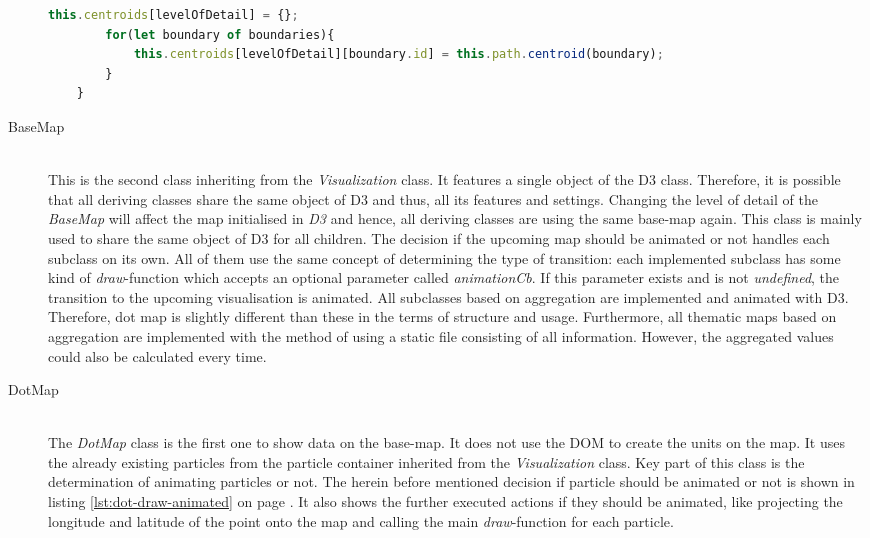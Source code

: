 \begin{description}
\begin{lstlisting}[language=JavaScript, caption={Calculate a look-up dictionary for all data items depending on the level of detail.}, label={lst:d3-calculate-centroids}]
        this.centroids[levelOfDetail] = {};
        for(let boundary of boundaries){
            this.centroids[levelOfDetail][boundary.id] = this.path.centroid(boundary);
        }
    }
\end{lstlisting}


\item[BaseMap] \hfill \\
This is the second class inheriting from the \textit{Visualization} class. It features a single object of the \ac{D3} class. Therefore, it is possible that all deriving classes share the same object of \ac{D3} and thus, all its features and settings. Changing the level of detail of the \textit{BaseMap} will affect the map initialised in \textit{\ac{D3}} and hence, all deriving classes are using the same base-map again. This class is mainly used to share the same object of \ac{D3} for all children.
The decision if the upcoming map should be animated or not handles each subclass on its own. All of them use the same concept of determining the type of transition: each implemented subclass has some kind of \textit{draw}-function which accepts an optional parameter called \textit{animationCb}. If this parameter exists and is not \textit{undefined}, the transition to the upcoming visualisation is animated.
All subclasses based on aggregation are implemented and animated with \ac{D3}. Therefore, dot map is slightly different than these in the terms of structure and usage. Furthermore, all thematic maps based on aggregation are implemented with the method of using a static file consisting of all information. However, the aggregated values could also be calculated every time.

\item[DotMap] \hfill \\
The \textit{DotMap} class is the first one to show data on the base-map. It does not use the \ac{DOM} to create the units on the map. It uses the already existing particles from the particle container inherited from the \textit{Visualization} class. Key part of this class is the determination of animating particles or not.
The herein before mentioned decision if particle should be animated or not is shown in listing \ref{lst:dot-draw-animated} on page \pageref{lst:dot-draw-animated}. It also shows the further executed actions if they should be animated, like projecting the longitude and latitude of the point onto the map and calling the main \textit{draw}-function for each particle.


\end{description}

